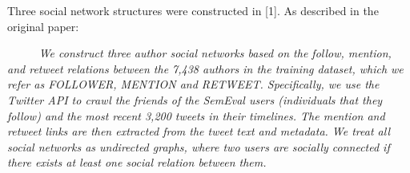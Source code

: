 {
Three social network structures were constructed in [1]. As described in the original paper:
\begin{description}
	\item 

~~~~~\emph{
We construct three author social networks based on the follow, mention, and retweet relations between the 7,438 authors in the training dataset,
which we refer as FOLLOWER, MENTION and RETWEET. Specifically, we use the Twitter API to crawl the friends of the SemEval users (individuals
that they follow) and the most recent 3,200 tweets in their timelines. The mention and retweet links are then extracted from the tweet text and metadata.
We treat all social networks as undirected graphs, where two users are socially connected if there exists at least one social relation between them.}
\end{description}
}
